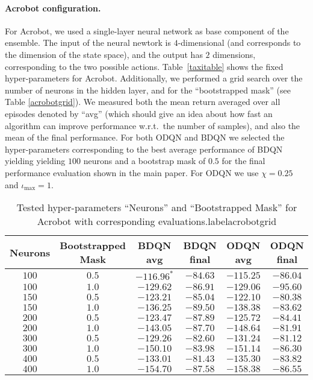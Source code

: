 \paragraph{Acrobot configuration.} For Acrobot, we used a single-layer neural network as base component of the ensemble. The input of the neural newtork is $4$-dimensional (and corresponds to the dimension of the state space), and the output has $2$ dimensions, corresponding to the two possible actions. 
Table~\ref{taxitable} shows the fixed hyper-parameters for Acrobot. Additionally, we
performed a grid search over the number of neurons in the hidden layer, and for the ``bootstrapped mask'' (see Table \ref{acrobotgrid}). We measured both the mean return averaged over all episodes
denoted by ``avg'' (which should give an idea about how fast an algorithm can improve performance w.r.t.\ the number of samples), and also the mean of the final performance. For both ODQN and BDQN we selected the hyper-parameters corresponding to the best average performance of BDQN yielding
yielding $100$ neurons and a bootstrap mask of $0.5$ for the final performance evaluation shown in the main paper. For ODQN we use $\chi = 0.25$ and $\iota_{\max}=1$.
\begin{table}[h]
	\begin{tabular}{ c c | c c | c c  }
		\textbf{Neurons} & \textbf{Bootstrapped Mask} & \textbf{BDQN} avg & \textbf{BDQN} final & \textbf{ODQN} avg & \textbf{ODQN} final  \\ 
		\hline
		$100$ & $0.5$ & $-116.96^*$ & $-84.63$ & $-115.25$ & $-86.04$ \\
		$100$ & $1.0$ & $-129.62$ & $-86.91$ & $-129.06$ & $-95.60$ \\
		$150$ & $0.5$ & $-123.21$ & $-85.04$ & $-122.10$ & $-80.38$ \\
		$150$ & $1.0$ & $-136.25$ & $-89.50$ & $-138.38$ & $-83.62$ \\
		$200$ & $0.5$ & $-123.47$ & $-87.89$ & $-125.72$ & $-84.41$ \\
		$200$ & $1.0$ & $-143.05$ & $-87.70$ & $-148.64$ & $-81.91$  \\
		$300$ & $0.5$ & $-129.26$ & $-82.60$ & $-131.24$ & $-81.12$ \\
		$300$ & $1.0$ & $-150.10$ & $-83.98$ & $-151.14$ & $-86.30$ \\
		$400$ & $0.5$ & $-133.01$ & $-81.43$ & $-135.30$ & $-83.82$ \\
		$400$ & $1.0$ & $-154.70$ & $-87.58$ & $-158.38$ & $-86.55$ \\
	\end{tabular}
	\caption{Tested hyper-parameters ``Neurons'' and ``Bootstrapped Mask'' for Acrobot with corresponding evaluations.label{acrobotgrid}}
\end{table}

